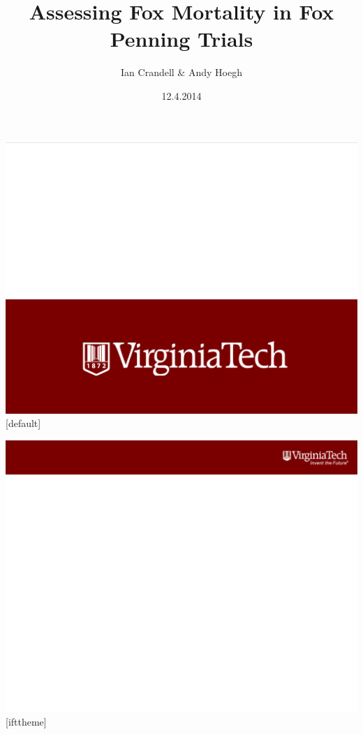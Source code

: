 \documentclass{beamer}
\title{Assessing Fox Mortality in Fox Penning Trials}
\author{Ian Crandell \& Andy Hoegh}
\institute{
Department of Statistics, Virginia Tech
}
\date{12.4.2014}
\begin{document}
\newcommand\Fontvi{\fontsize{6}{7.2}\selectfont}

 {\includegraphics[width=\paperwidth,height=\paperheight]{frontpage}}
[default]

\begin{frame}
  \titlepage
  \vspace{5cm}
\end{frame}

%
%
 {\includegraphics[width=\paperwidth,height=\paperheight]{slide_small}}
[ifttheme]
\end{document}
